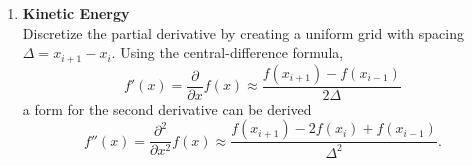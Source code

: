 \documentclass[20pt,margin=1in,innermargin=-4.5in,blockverticalspace=-0.25in]{tikzposter}
\begin{document}
\begin{columns}
{\begin{enumerate}
\begin{equation}
          \begin{split}
            \hat{H} \psi_n &= E_n \psi_n \\
            (\hat{T} + \hat{V}) \psi_n &= E_n \psi_n \\
            \Big[ - \frac{\hbar^2}{2m} + D_e (e^{- \omega_x x} - 1)^2 \Big] \psi_n &= E_n \psi_n
          \end{split}
        \end{equation}
        \item \textbf{Kinetic Energy}\\
        Discretize the partial derivative by creating a uniform grid with spacing $\Delta = x_{i+1} - x_{i}$. Using the central-difference formula,
        \begin{equation}
          f'(x) = \frac{\partial}{\partial x} f(x) \approx \frac{f(x_{i+1}) - f(x_{i-1})}{2 \Delta}
        \end{equation}
        a form for the second derivative can be derived
        \begin{equation}
          f''(x) = \frac{\partial^2}{\partial x^2} f(x) \approx \frac{f(x_{i+1}) - 2 f(x_i) + f(x_{i-1})}{\Delta^2} .
        \end{equation}\\
      \end{enumerate}
    }


\end{columns}
\end{document}
